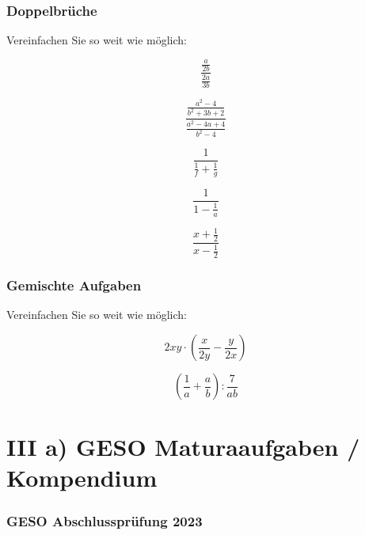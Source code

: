 \section{Doppelbrüche}
Vereinfachen Sie so weit wie möglich:

\begin{bbwAufgabenBlock}
\item $$\frac{\frac{a}{2b}}{\frac{2a}{3b}}$$

\item $$\frac{\frac{a^2-4}{b^2+3b+2}}{\frac{a^2-4a+4}{b^2-4}}$$

\item $$\frac{1}{\frac1f + \frac1g}$$

\item $$\frac{1}{1-\frac1a}$$

\item $$\frac{x+\frac12}{x-\frac12}$$

\end{bbwAufgabenBlock}
\newpage
\section{Gemischte Aufgaben}
Vereinfachen Sie so weit wie möglich:

\begin{bbwAufgabenBlock}
\item $$2xy \cdot{} \left( \frac{x}{2y} - \frac{y}{2x} \right)$$

\item $$\left( \frac1a + \frac{a}b \right) : \frac7{ab}$$
\end{bbwAufgabenBlock}
\newpage


\part*{III a) GESO Maturaaufgaben / Kompendium}


\section*{GESO Abschlussprüfung 2023}

